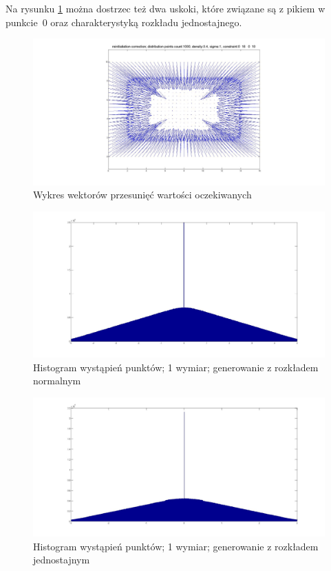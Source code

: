 \documentclass{mini}
\begin{document}
Na rysunku \ref{bladzenie:reinicjacja1dj} można dostrzec też dwa uskoki, które związane są z pikiem w punkcie~$0$ oraz charakterystyką rozkładu jednostajnego.

\begin{figure}[H]
\centering
\includegraphics[width=\textwidth]{reinitialization2dprzesuniecie}
\caption{Wykres wektorów przesunięć wartości oczekiwanych}
\end{figure}

\begin{figure}[H]
\centering
\includegraphics[width=\textwidth]{ri_n_20M_1__5_5}
\caption{Histogram wystąpień punktów; 1 wymiar; generowanie z rozkładem normalnym}
\end{figure}

\begin{figure}[H]
\centering
\includegraphics[width=\textwidth]{ri_j_20M_1__3_3}
\caption{Histogram wystąpień punktów; 1 wymiar; generowanie z rozkładem jednostajnym}
\label{bladzenie:reinicjacja1dj}
\end{figure}
\end{document}
